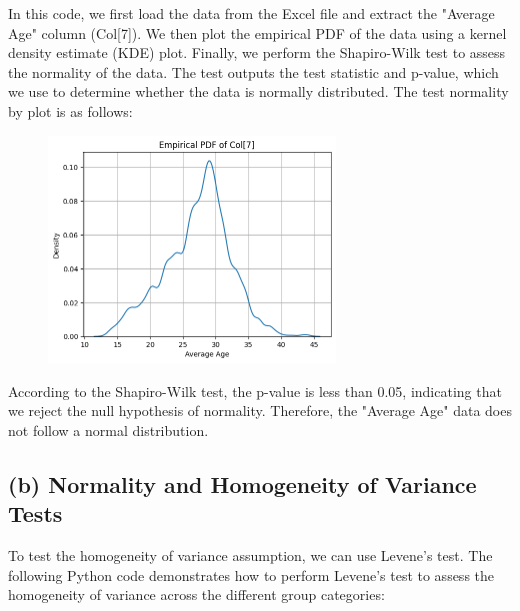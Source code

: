 \documentclass[12pt]{article}
\begin{document}
In this code, we first load the data from the Excel file and extract the "Average Age" column (Col[7]). We then plot the empirical PDF of the data using a kernel density estimate (KDE) plot. Finally, we perform the Shapiro-Wilk test to assess the normality of the data. The test outputs the test statistic and p-value, which we use to determine whether the data is normally distributed. The test normality by plot is as follows:

\begin{figure}[h]
    \centering
    \includegraphics[width=0.68\textwidth]{image/output1.png}  
    \label{fig:Output for Normality Test}
\end{figure}

According to the Shapiro-Wilk test, the p-value is less than 0.05, indicating that we reject the null hypothesis of normality. Therefore, the "Average Age" data does not follow a normal distribution.

\subsection*{(b) Normality and Homogeneity of Variance Tests}


To test the homogeneity of variance assumption, we can use Levene's test. The following Python code demonstrates how to perform Levene's test to assess the homogeneity of variance across the different group categories:
\end{document}
